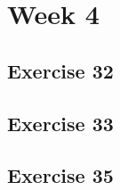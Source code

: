 \documentclass[a4paper]{article}
\let\stdsection\section
\renewcommand\section{\newpage\stdsection}
\begin{document}
\section*{Week 4}


\newpage
\subsection*{Exercise 32}


\subsection*{Exercise 33}






%
%
%
%

\newpage
\subsection*{Exercise 35}
\end{document}
